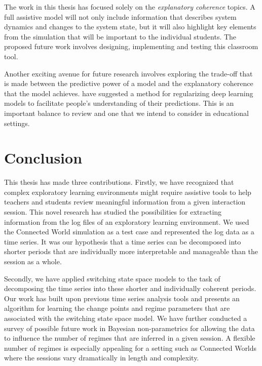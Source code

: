 The work in this thesis has focused solely on the \textit{explanatory coherence} topics. A full assistive model will not only include information that describes system dynamics and changes to the system state, but it will also highlight key elements from the simulation that will be important to the individual students. The proposed future work involves designing, implementing and testing this classroom tool.

Another exciting avenue for future research involves exploring the trade-off that is made between the predictive power of a model and the explanatory coherence that the model achieves. \cite{wu2017beyond} have suggested a method for regularizing deep learning models to facilitate people's understanding of their predictions. This is an important balance to review and one that we intend to consider in educational settings.

\section{Conclusion}

This thesis has made three contributions. Firstly, we have recognized that complex exploratory learning environments might require assistive tools to help teachers and students review meaningful information from a given interaction session. This novel research has studied the possibilities for extracting information from the log files of an exploratory learning environment. We used the Connected World simulation as a test case and represented the log data as a time series. It was our hypothesis that a time series can be decomposed into shorter periods that are individually more interpretable and manageable than the session as a whole.

Secondly, we have applied switching state space models to the task of decomposing the time series into these shorter and individually coherent periods. Our work has built upon previous time series analysis tools and presents an algorithm for learning the change points and regime parameters that are associated with the switching state space model. We have further conducted a survey of possible future work in Bayesian non-parametrics for allowing the data to influence the number of regimes that are inferred in a given session. A flexible number of regimes is especially appealing for a setting such as Connected Worlds where the sessions vary dramatically in length and complexity.


